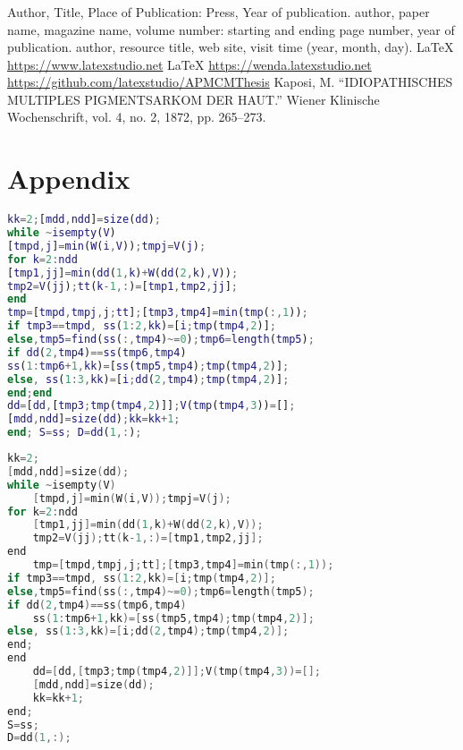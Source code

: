 \documentclass{apmcmthesis}
\begin{document}
\subsubsection{}



\subsubsection{}





\begin{thebibliography}{9}%
   Author, Title, Place of Publication: Press, Year of publication.
   author, paper name, magazine name, volume number: starting and ending
  page number, year of publication.
   author, resource title, web site, visit time (year, month, day).
   \LaTeX{} \url{https://www.latexstudio.net}
   \LaTeX{} \url{https://wenda.latexstudio.net}
    \url{https://github.com/latexstudio/APMCMThesis}
   Kaposi, M. “IDIOPATHISCHES MULTIPLES PIGMENTSARKOM DER HAUT.” Wiener Klinische Wochenschrift, vol. 4, no. 2, 1872, pp. 265–273.
\end{thebibliography}

\newpage

\section{Appendix}
\begin{lstlisting}[language=matlab,caption={The matlab Source code of Algorithm}]
kk=2;[mdd,ndd]=size(dd);
while ~isempty(V)
[tmpd,j]=min(W(i,V));tmpj=V(j);
for k=2:ndd
[tmp1,jj]=min(dd(1,k)+W(dd(2,k),V));
tmp2=V(jj);tt(k-1,:)=[tmp1,tmp2,jj];
end
tmp=[tmpd,tmpj,j;tt];[tmp3,tmp4]=min(tmp(:,1));
if tmp3==tmpd, ss(1:2,kk)=[i;tmp(tmp4,2)];
else,tmp5=find(ss(:,tmp4)~=0);tmp6=length(tmp5);
if dd(2,tmp4)==ss(tmp6,tmp4)
ss(1:tmp6+1,kk)=[ss(tmp5,tmp4);tmp(tmp4,2)];
else, ss(1:3,kk)=[i;dd(2,tmp4);tmp(tmp4,2)];
end;end
dd=[dd,[tmp3;tmp(tmp4,2)]];V(tmp(tmp4,3))=[];
[mdd,ndd]=size(dd);kk=kk+1;
end; S=ss; D=dd(1,:);
 \end{lstlisting}
\begin{lstlisting}[language=c,caption={The lingo source code}]
kk=2;
[mdd,ndd]=size(dd);
while ~isempty(V)
    [tmpd,j]=min(W(i,V));tmpj=V(j);
for k=2:ndd
    [tmp1,jj]=min(dd(1,k)+W(dd(2,k),V));
    tmp2=V(jj);tt(k-1,:)=[tmp1,tmp2,jj];
end
    tmp=[tmpd,tmpj,j;tt];[tmp3,tmp4]=min(tmp(:,1));
if tmp3==tmpd, ss(1:2,kk)=[i;tmp(tmp4,2)];
else,tmp5=find(ss(:,tmp4)~=0);tmp6=length(tmp5);
if dd(2,tmp4)==ss(tmp6,tmp4)
    ss(1:tmp6+1,kk)=[ss(tmp5,tmp4);tmp(tmp4,2)];
else, ss(1:3,kk)=[i;dd(2,tmp4);tmp(tmp4,2)];
end;
end
    dd=[dd,[tmp3;tmp(tmp4,2)]];V(tmp(tmp4,3))=[];
    [mdd,ndd]=size(dd);
    kk=kk+1;
end;
S=ss;
D=dd(1,:);
 \end{lstlisting}
\end{document}
